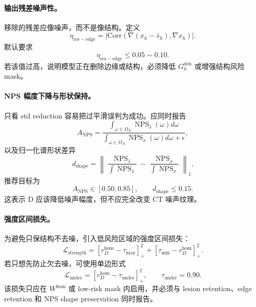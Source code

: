\documentclass[11pt,a4paper,UTF8,fontset=fandol]{ctexart}
\theoremstyle{definition}
\DeclareMathOperator{\NPS}{NPS}
\begin{document}
\paragraph{输出残差噪声性。}
移除的残差应像噪声，而不是像结构。定义
\begin{equation}
    \eta_{\mathrm{res-edge}}
    =\left|\mathrm{Corr}\left(\nabla(x_h-\hat s_h),\nabla x_h\right)\right|.
\end{equation}
默认要求
\begin{equation}
    \eta_{\mathrm{res-edge}}\le 0.05\sim0.10.
\end{equation}
若该值过高，说明模型正在删除边缘或结构，必须降低 $G_h^{\mathrm{den}}$ 或增强结构风险 mask。

\paragraph{NPS 幅度下降与形状保持。}
只看 std reduction 容易把过平滑误判为成功。应同时报告
\begin{equation}
    A_{\mathrm{NPS}}
    =\frac{\int_{\omega\in\Omega_N}\NPS_{\hat s}(\omega)d\omega}
    {\int_{\omega\in\Omega_N}\NPS_x(\omega)d\omega+\epsilon},
\end{equation}
以及归一化谱形状差异
\begin{equation}
    d_{\mathrm{shape}}
    =\left\|
    \frac{\NPS_{\hat s}}{\int \NPS_{\hat s}}
    -
    \frac{\NPS_x}{\int \NPS_x}
    \right\|_1.
\end{equation}
推荐目标为
\begin{equation}
    A_{\mathrm{NPS}}\in[0.50,0.85],
    \qquad
    d_{\mathrm{shape}}\le0.15.
\end{equation}
这表示 D 应该降低噪声幅度，但不应完全改变 CT 噪声纹理。

\paragraph{强度区间损失。}
为避免只保结构不去噪，引入低风险区域的强度区间损失：
\begin{equation}
    \mathcal L_{\mathrm{strength}}
    =\left[r_D^{\mathrm{hom}}-\tau_{\max}\right]_+^2
    +\left[\tau_{\min}-r_D^{\mathrm{hom}}\right]_+^2.
\end{equation}
若只想先防止欠去噪，可使用单边形式
\begin{equation}
    \mathcal L_{\mathrm{under}}
    =\left[r_D^{\mathrm{hom}}-\tau_{\mathrm{under}}\right]_+^2,
    \qquad \tau_{\mathrm{under}}=0.90.
\end{equation}
该损失只应在 $W^{\mathrm{hom}}$ 或 low-risk mask 内启用，并必须与 lesion retention、edge retention 和 NPS shape preservation 同时报告。
\end{document}
